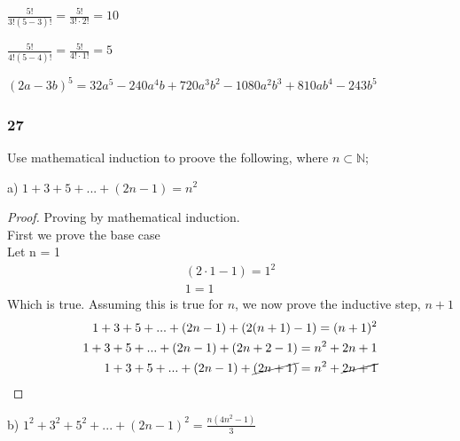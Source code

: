 \documentclass[]{report}
\begin{document}
$\frac{5!}{3!(5-3)!} = \frac{5!}{3! \cdot 2!} = 10$

$\frac{5!}{4!(5-4)!} = \frac{5!}{4! \cdot 1!} = 5$

$(2a - 3b)^5 = 32a^5 -240a^4b + 720a^3b^2 - 1080a^2b^3 + 810ab^4 - 243b^5$

\subsubsection{27}

Use mathematical induction to proove the following, where $n \subset \mathbb{N}$;

a) $1 + 3 + 5 + ... + (2n-1) = n^2$

\begin{proof}
	Proving by mathematical induction.\\
	First we prove the base case\\
	Let n = 1\\
	\begin{align*}
		(2\cdot 1 - 1) = 1^2 \\
		1 = 1
	\end{align*}	
	Which is true. Assuming this is true for $n$, we now prove the inductive step, $n+1$
	\begin{align*}
	1 + 3 + 5 + ... + (2n-1)  + (2(n+1) - 1) = (n + 1)^2\\
	1 + 3 + 5 + ... + (2n-1)  + (2n + 2 - 1) = n^2 + 2n + 1 \\
	1 + 3 + 5 + ... + (2n-1)  + \cancel{(2n + 1)} = n^2 + \cancel{2n + 1}
	\end{align*}
\end{proof}

b) $1^2 + 3^2 + 5^2 + ...  +(2n - 1)^2 = \frac{n(4n^2 -1)}{3}$
\end{document}
